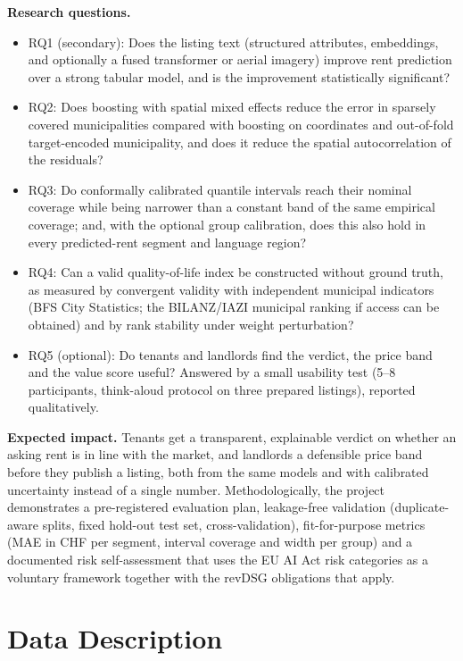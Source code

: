 \documentclass[11pt,a4paper]{article}
\begin{document}
\textbf{Research questions.}
\begin{itemize}
    \item RQ1 (secondary): Does the listing text (structured attributes, embeddings, and optionally a fused transformer or aerial imagery) improve rent prediction over a strong tabular model, and is the improvement statistically significant?
    \item RQ2: Does boosting with spatial mixed effects reduce the error in sparsely covered municipalities compared with boosting on coordinates and out-of-fold target-encoded municipality, and does it reduce the spatial autocorrelation of the residuals?
    \item RQ3: Do conformally calibrated quantile intervals reach their nominal coverage while being narrower than a constant band of the same empirical coverage; and, with the optional group calibration, does this also hold in every predicted-rent segment and language region?
    \item RQ4: Can a valid quality-of-life index be constructed without ground truth, as measured by convergent validity with independent municipal indicators (BFS City Statistics; the BILANZ/IAZI municipal ranking if access can be obtained) and by rank stability under weight perturbation?
    \item RQ5 (optional): Do tenants and landlords find the verdict, the price band and the value score useful? Answered by a small usability test (5--8 participants, think-aloud protocol on three prepared listings), reported qualitatively.
\end{itemize}

\textbf{Expected impact.} Tenants get a transparent, explainable verdict on whether an asking rent is in line with the market, and landlords a defensible price band before they publish a listing, both from the same models and with calibrated uncertainty instead of a single number. Methodologically, the project demonstrates a pre-registered evaluation plan, leakage-free validation (duplicate-aware splits, fixed hold-out test set, cross-validation), fit-for-purpose metrics (MAE in CHF per segment, interval coverage and width per group) and a documented risk self-assessment that uses the EU AI Act risk categories as a voluntary framework together with the revDSG obligations that apply.

\section{Data Description}
\end{document}
